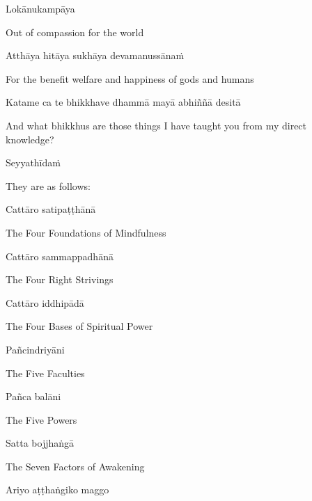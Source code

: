 Lokānukampāya

\begin{cprenglish}
  Out of compassion for the world
\end{cprenglish}

Atthāya hitāya sukhāya devamanussānaṁ

\begin{cprenglish}
  For the benefit welfare and happiness of gods and humans
\end{cprenglish}

Katame ca te bhikkhave dhammā mayā abhiññā desitā

\begin{cprenglish}
  And what bhikkhus are those things I have taught you from my direct knowledge?
\end{cprenglish}

Seyyathīdaṁ

\begin{cprenglish}
  They are as follows:
\end{cprenglish}

Cattāro satipaṭṭhānā

\begin{cprenglish}
  The Four Foundations of Mindfulness
\end{cprenglish}

Cattāro sammappadhānā

\begin{cprenglish}
  The Four Right Strivings
\end{cprenglish}

Cattāro iddhipādā

\begin{cprenglish}
  The Four Bases of Spiritual Power
\end{cprenglish}

Pañcindriyāni

\begin{cprenglish}
  The Five Faculties
\end{cprenglish}

Pañca balāni

\begin{cprenglish}
  The Five Powers
\end{cprenglish}

Satta bojjhaṅgā

\begin{cprenglish}
  The Seven Factors of Awakening
\end{cprenglish}

Ariyo aṭṭhaṅgiko maggo

